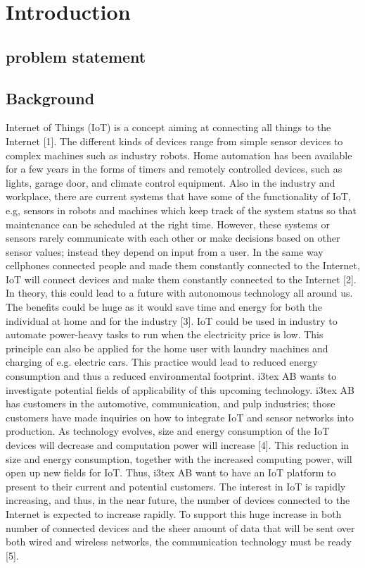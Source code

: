 \section{Introduction \cite{bregell_hardware_2015}}

\subsection{problem statement}


\subsection{Background}

Internet of Things (IoT) is a concept aiming at connecting all things to the Internet [1].
The different kinds of devices range from simple sensor devices to complex machines such as industry robots.
Home automation has been available for a few years in the forms of timers and remotely controlled devices,
	such as lights,
	garage door,
	and climate control equipment.
Also in the industry and workplace,
	there are current systems that have some of the functionality of IoT,
	e.g,
	sensors in robots and machines which keep track of the system status so that maintenance can be scheduled at the right time.
However,
	these systems or sensors rarely communicate with each other or make decisions based on other sensor values;
	instead they depend on input from a user.
In the same way cellphones connected people and made them constantly connected to the Internet,
	IoT will connect devices and make them constantly connected to the Internet [2].
In theory,
	this could lead to a future with autonomous technology all around us.
The benefits could be huge as it would save time and energy for both the individual at home and for the industry [3].
IoT could be used in industry to automate power-heavy tasks to run when the electricity price is low.
This principle can also be applied for the home user with laundry machines and charging of e.g.
electric cars.
This practice would lead to reduced energy consumption and thus a reduced environmental footprint.
i3tex AB wants to investigate potential fields of applicability of this upcoming technology.
i3tex AB has customers in the automotive,
	communication,
	and pulp industries;
	those customers have made inquiries on how to integrate IoT and sensor networks into production.
As technology evolves,
	size and energy consumption of the IoT devices will decrease and computation power will increase [4].
This reduction in size and energy consumption,
	together with the increased computing power,
	will open up new fields for IoT.
Thus,
	i3tex AB want to have an IoT platform to present to their current and potential customers.
The interest in IoT is rapidly increasing,
	and thus,
	in the near future,
	the number of devices connected to the Internet is expected to increase rapidly.
To support this huge increase in both number of connected devices and the sheer amount of data that will be sent over both wired and wireless networks,
	the communication technology must be ready [5].
	

